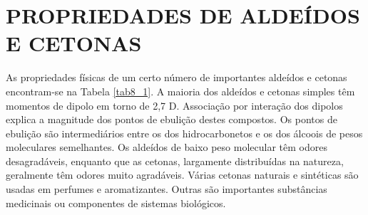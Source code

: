 \section{PROPRIEDADES DE ALDEÍDOS E CETONAS}

As propriedades físicas de um certo número de importantes aldeídos e cetonas encontram-se na Tabela \ref{tab8_1}. A maioria dos aldeídos e cetonas simples têm momentos de dipolo em torno de 2,7 D. Associação por interação dos dipolos explica a magnitude dos pontos de ebulição destes compostos. Os pontos de ebulição são intermediários entre os dos hidrocarbonetos e os dos álcoois de pesos moleculares semelhantes. Os aldeídos de baixo peso molecular têm odores desagradáveis, enquanto que as cetonas, largamente distribuídas na natureza, geralmente têm odores muito agradáveis. Várias cetonas naturais e sintéticas são usadas em perfumes e aromatizantes. Outras são importantes substâncias medicinais ou componentes de sistemas biológicos.

